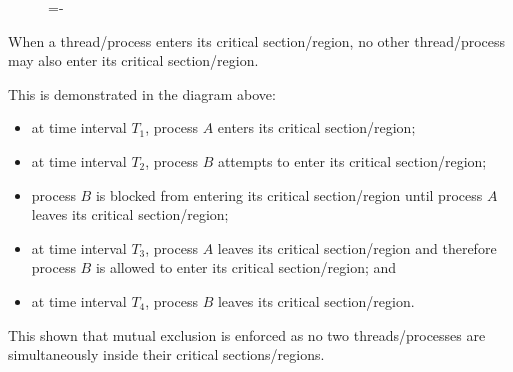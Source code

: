 \documentclass[a4paper]{systems-software}
\begin{document}
\begin{figure}[H]
  \lineskip=-\fboxrule
\end{figure}

When a thread/process enters its critical section/region, no other thread/process may also enter its critical section/region. 

This is demonstrated in the diagram above:
\begin{itemize}
	\item at time interval $T_{1}$, process $A$ enters its critical section/region;
	\item at time interval $T_{2}$, process $B$ attempts to enter its critical section/region;
	\item process $B$ is blocked from entering its critical section/region until process $A$ leaves its critical section/region;
	\item at time interval $T_{3}$, process $A$ leaves its critical section/region and therefore process $B$ is allowed to enter its critical section/region; and
	\item at time interval $T_{4}$, process $B$ leaves its critical section/region.
\end{itemize}

This shown that mutual exclusion is enforced as no two threads/processes are simultaneously inside their critical sections/regions.
\end{document}
